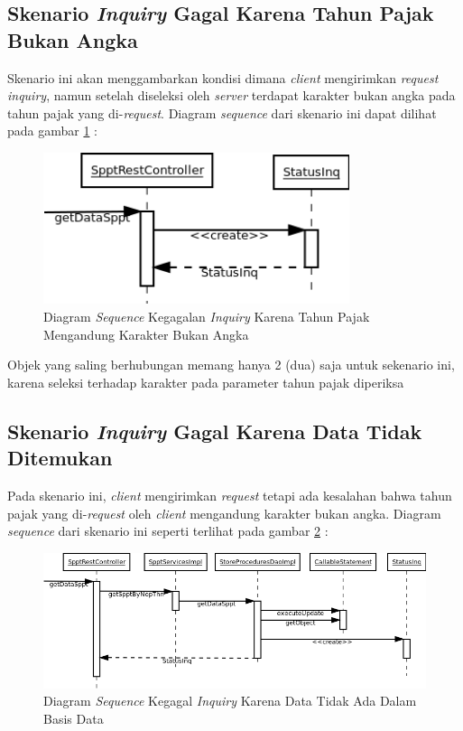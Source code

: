\subsection{Skenario \textit{Inquiry} Gagal Karena Tahun Pajak Bukan Angka}

Skenario ini akan menggambarkan kondisi dimana \textit{client} mengirimkan \textit{request inquiry}, namun setelah diseleksi oleh \textit{server} terdapat karakter bukan angka pada tahun pajak yang di-\textit{request}. Diagram \textit{sequence} dari skenario ini dapat dilihat pada gambar \ref{fig:uml-seq-inq-thn-not-valid} :

\begin{figure}[H]
  \centering
  \includegraphics[width=0.8\textwidth]{./resources/uml/uml-seq-inq-thn-not-valid}
  \caption{Diagram \textit{Sequence} Kegagalan \textit{Inquiry} Karena Tahun Pajak Mengandung Karakter Bukan Angka}
  \label{fig:uml-seq-inq-thn-not-valid}
\end{figure}

Objek yang saling berhubungan memang hanya 2 (dua) saja untuk sekenario ini, karena seleksi terhadap karakter pada parameter tahun pajak diperiksa 

\subsection{Skenario \textit{Inquiry} Gagal Karena Data Tidak Ditemukan}

Pada skenario ini, \textit{client} mengirimkan \textit{request} tetapi ada kesalahan bahwa tahun pajak yang di-\textit{request} oleh \textit{client} mengandung karakter bukan angka. Diagram \textit{sequence} dari skenario ini seperti terlihat pada gambar \ref{fig:uml-seq-inq-not-any} :

\begin{figure}[H] 
  \centering
  \includegraphics[width=1\textwidth]{./resources/uml/uml-seq-inq-not-any}
  \caption{Diagram \textit{Sequence} Kegagal \textit{Inquiry} Karena Data Tidak Ada Dalam Basis Data}
  \label{fig:uml-seq-inq-not-any}
\end{figure}

